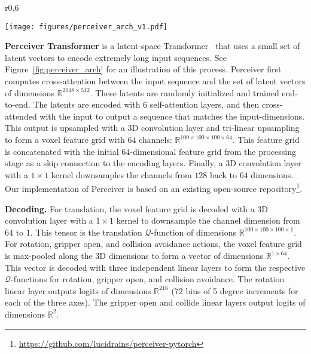 \documentclass{article}
\newcommand{\figref}[1]{Figure~\ref{#1}}
\begin{document}
\begin{wrapfigure}[13]{r}{0.6\textwidth}
  \vspace{-0.7cm}
  \begin{center}
    \texttt{[image: figures/perceiver\_arch\_v1.pdf]}
  \caption{\textbf{Perceiver Transformer Architecture.} Perceiver is a latent-space transformer. Q, K, V represent queries, keys, and values, respectively. We use 6 self-attention layers in our implementation.}
  \vspace{2cm}
  \label{fig:perceiver_arch}
  \end{center}
\end{wrapfigure}
\textbf{Perceiver Transformer} is a latent-space Transformer~\citep{jaegle2021perceiver} that uses a small set of latent vectors to encode extremely long input sequences. See \figref{fig:perceiver_arch} for an illustration of this process. 
Perceiver first computes cross-attention between the input sequence and the set of latent vectors of dimensions $\mathbb{R}^{2048 \times 512}$. 
These latents are randomly initialized and trained end-to-end. The latents are encoded with 6 self-attention layers, and then cross-attended with the input to output a sequence that matches the input-dimensions. This output is upsampled with a 3D convolution layer and tri-linear upsampling to form a voxel feature grid with $64$ channels: $\mathbb{R}^{100 \times 100 \times 100 \times 64}$. 
This feature grid is concatenated with the initial $64$-dimensional feature grid from the processing stage as a skip connection to the encoding layers. 
Finally, a 3D convolution layer with a $1 \times 1$ kernel downsamples the channels from $128$ back to $64$ dimensions.
Our implementation of Perceiver is based on an existing open-source repository\footnote{\url{https://github.com/lucidrains/perceiver-pytorch}}.

\textbf{Decoding.} For translation, the voxel feature grid is decoded with a 3D convolution layer with a $1\times1$ kernel to downsample the channel dimension from $64$ to $1$. This tensor is the translation $\mathcal{Q}$-function of dimensions $\mathbb{R}^{100 \times 100 \times 100 \times 1}$. For rotation, gripper open, and collision avoidance actions, the voxel feature grid is max-pooled along the 3D dimensions to form a vector of dimensions $\mathbb{R}^{1 \times 64}$. This vector is decoded with three independent linear layers to form the respective $\mathcal{Q}$-functions for rotation, gripper open, and collision avoidance. The rotation linear layer outputs logits of dimensions $\mathbb{R}^{216}$ ($72$ bins of 5 degree increments for each of the three axes). The gripper open and collide linear layers output logits of dimensions $\mathbb{R}^{2}$.
\end{document}
